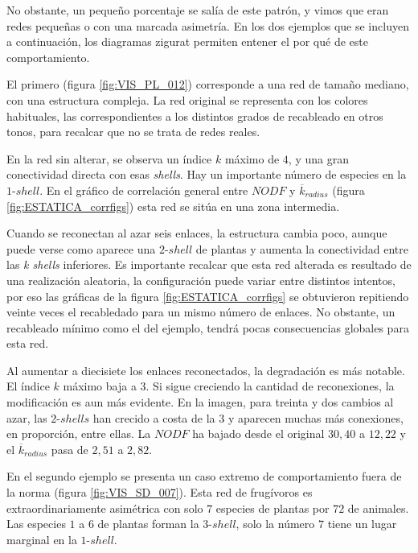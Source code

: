 No obstante, un pequeño porcentaje se salía de este patrón, y vimos que eran redes pequeñas o con una marcada asimetría. En los dos ejemplos que se incluyen a continuación, los diagramas zigurat permiten entener el por qué de este comportamiento.

El primero (figura \ref{fig:VIS_PL_012}) corresponde a una red de tamaño mediano, con una estructura compleja. La red original se representa con los colores habituales, las correspondientes a los distintos grados de recableado en otros tonos, para recalcar que no se trata de redes reales. 

En la red sin alterar, se observa un índice $k$ máximo de $4$, y una gran conectividad directa con esas \textit{shells}. Hay un importante número de especies en la $1$-$shell$. En el gráfico de correlación general entre $NODF$ y $\overline k_{radius}$ (figura \ref{fig:ESTATICA_corrfigs}) esta red se sitúa en una zona intermedia.

Cuando se reconectan al azar seis enlaces, la estructura cambia poco, aunque puede verse como aparece una $2$-$shell$ de plantas y aumenta la conectividad entre las \textit{k shells} inferiores. Es importante recalcar que esta red alterada es resultado de una realización aleatoria, la configuración puede variar entre distintos intentos, por eso las gráficas de la figura \ref{fig:ESTATICA_corrfigs} se obtuvieron repitiendo veinte veces el recabledado para un mismo número de enlaces. No obstante, un recableado mínimo como el del ejemplo, tendrá pocas consecuencias globales para esta red.

Al aumentar a diecisiete los enlaces reconectados, la degradación es más notable. El índice $k$ máximo baja a $3$. Si sigue creciendo la cantidad de reconexiones, la modificación es aun más evidente. En la imagen, para treinta y dos cambios al azar, las $2$-$shells$ han crecido a costa de la $3$ y aparecen muchas más conexiones, en proporción, entre ellas. La $NODF$ ha bajado desde el original $30,40$ a $12,22$ y el $\overline k_{radius}$ pasa de $2,51$ a $2,82$. 

En el segundo ejemplo se presenta un caso extremo de comportamiento fuera de la norma  (figura \ref{fig:VIS_SD_007}). Esta red de frugívoros es extraordinariamente asimétrica con solo $7$ especies de plantas por $72$ de animales. Las especies $1$ a $6$ de plantas forman la $3$-$shell$, solo la número $7$ tiene un lugar marginal en la $1$-$shell$.

